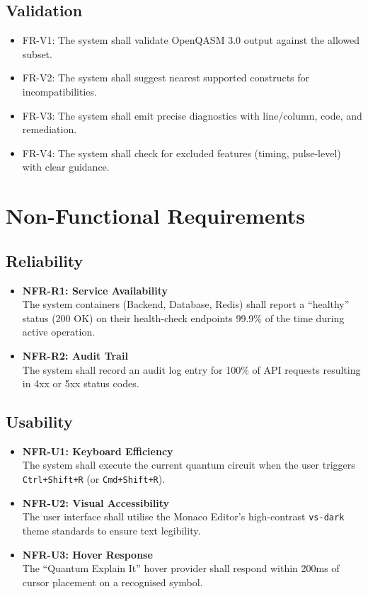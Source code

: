 \subsection{Validation}
\begin{itemize}
    \item FR-V1: The system shall validate OpenQASM 3.0 output against the allowed subset.
    \item FR-V2: The system shall suggest nearest supported constructs for incompatibilities.
    \item FR-V3: The system shall emit precise diagnostics with line/column, code, and remediation.
    \item FR-V4: The system shall check for excluded features (timing, pulse-level) with clear guidance.
\end{itemize}

\section{Non-Functional Requirements}

\subsection{Reliability}
\begin{itemize}
    \item \textbf{NFR-R1: Service Availability} \\
    The system containers (Backend, Database, Redis) shall report a ``healthy'' status (200 OK) on their health-check endpoints 99.9\% of the time during active operation.
    \item \textbf{NFR-R2: Audit Trail} \\
    The system shall record an audit log entry for 100\% of API requests resulting in 4xx or 5xx status codes.
\end{itemize}

\subsection{Usability}
\begin{itemize}
    \item \textbf{NFR-U1: Keyboard Efficiency} \\
    The system shall execute the current quantum circuit when the user triggers \texttt{Ctrl+Shift+R} (or \texttt{Cmd+Shift+R}).
    \item \textbf{NFR-U2: Visual Accessibility} \\
    The user interface shall utilise the Monaco Editor's high-contrast \texttt{vs-dark} theme standards to ensure text legibility.
    \item \textbf{NFR-U3: Hover Response} \\
    The ``Quantum Explain It'' hover provider shall respond within 200ms of cursor placement on a recognised symbol.
\end{itemize}

